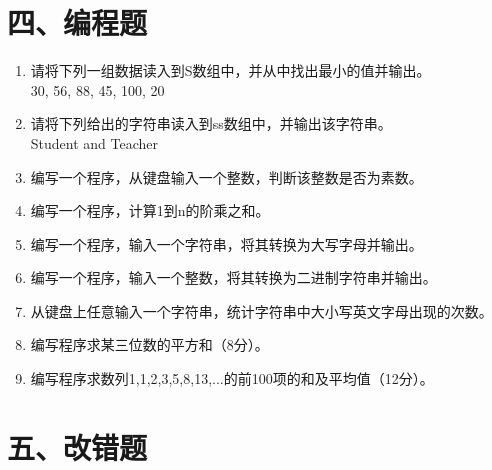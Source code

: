 \documentclass[a4paper,12pt]{article}
\begin{document}
\section*{四、编程题}

\begin{enumerate}
	\item 请将下列一组数据读入到S数组中，并从中找出最小的值并输出。\\
	      30, 56, 88, 45, 100, 20
	      \vspace{2cm}

	\item 请将下列给出的字符串读入到ss数组中，并输出该字符串。\\
	      Student and Teacher
	      \vspace{2cm}

	\item 编写一个程序，从键盘输入一个整数，判断该整数是否为素数。
	      \vspace{2cm}

	\item 编写一个程序，计算1到n的阶乘之和。
	      \vspace{2cm}

	\item 编写一个程序，输入一个字符串，将其转换为大写字母并输出。
	      \vspace{2cm}

	\item 编写一个程序，输入一个整数，将其转换为二进制字符串并输出。
	      \vspace{2cm}

	\item 从键盘上任意输入一个字符串，统计字符串中大小写英文字母出现的次数。
	      \vspace{2cm}

	\item 编写程序求某三位数的平方和（8分）。
	      \vspace{2cm}

	\item 编写程序求数列1,1,2,3,5,8,13,...的前100项的和及平均值（12分）。
	      \vspace{2cm}
\end{enumerate}

\section*{五、改错题}
\end{document}
